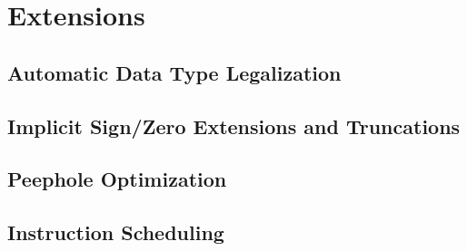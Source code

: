 %

\chapter{Extensions}
\section{Automatic Data Type Legalization}
\section{Implicit Sign/Zero Extensions and Truncations}
\section{Peephole Optimization}
\section{Instruction Scheduling}
